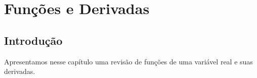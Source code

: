 \chapter{Funções e Derivadas}
\label{cap:funcoes_derivadas}

\minitoc

\section{Introdução}

Apresentamos nesse capítulo uma revisão de funções de uma variável real
e suas derivadas.




